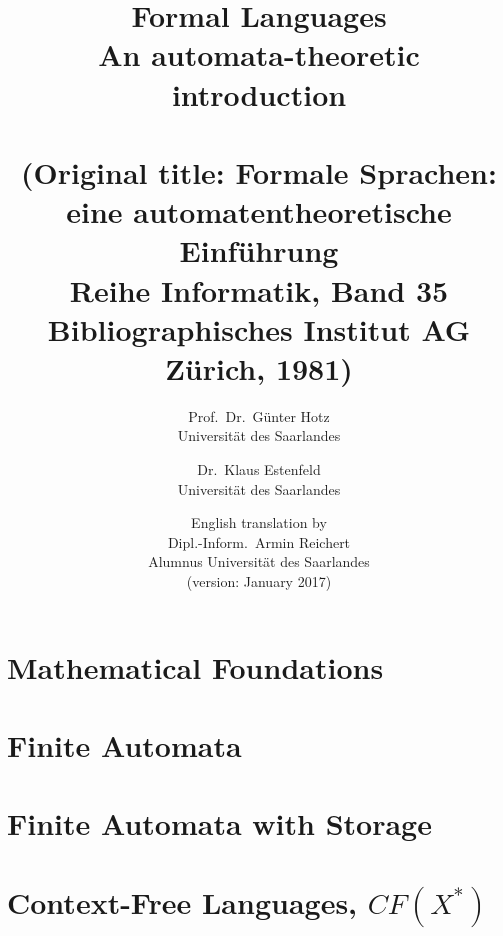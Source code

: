 \documentclass[a4paper]{amsbook}
\title{
Formal Languages\\An automata-theoretic introduction\\
\ \\
(Original title: Formale Sprachen: eine automatentheoretische Einführung\\
Reihe Informatik, Band 35\\
Bibliographisches Institut AG Zürich, 1981)
}
\author{
Prof.\ Dr.\ Günter Hotz\\Universität des Saarlandes 
\and Dr.\ Klaus Estenfeld\\Universität des Saarlandes
\and English translation by\\Dipl.-Inform.\ Armin Reichert\\Alumnus
Universität des Saarlandes\\(version: January 2017)}
\begin{document}
\maketitle
\tableofcontents


\chapter{Mathematical Foundations}






\chapter{Finite Automata}








\chapter{Finite Automata with Storage}





\chapter{Context-Free Languages, $CF(X^*)$}




\nocite{*}

\end{document}
